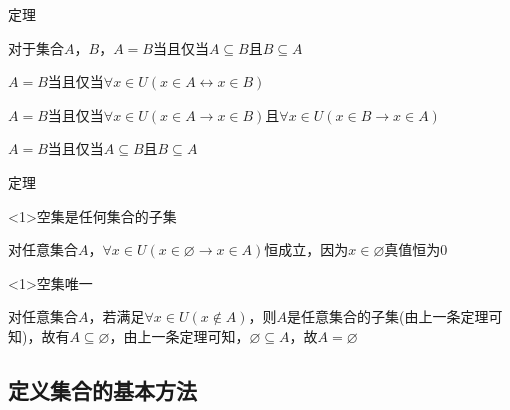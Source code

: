 \documentclass[xetex,10pt,aspectratio=43]{beamer}
\begin{document}
	\begin{frame}{定理}
		
		\begin{block}{对于集合$A$，$B$，$A=B\text{当且仅当}A\subseteq B\text{且}B\subseteq A$}
			
			$A=B\text{当且仅当}\forall x\in U(x\in A\leftrightarrow x\in B)$
			
			$A=B\text{当且仅当}\forall x\in U(x\in A\rightarrow x\in B)\text{且}\forall x\in U(x\in B\rightarrow x\in A)$
			
			$A=B\text{当且仅当}A\subseteq B\text{且}B\subseteq A$
			
		\end{block}
	
	\end{frame}

	\begin{frame}{定理}
		
		\begin{block}<1>{空集是任何集合的子集}
			
			对任意集合$A$，$\forall x\in U(x\in\varnothing\rightarrow x\in A)$恒成立，因为$x\in \varnothing$真值恒为$0$
			
		\end{block}
	
		\begin{block}<1>{空集唯一}
			
			对任意集合$A$，若满足$\forall x\in U(x\notin A)$，则$A$是任意集合的子集(由上一条定理可知)，故有$A\subseteq\varnothing$，由上一条定理可知，$\varnothing\subseteq A$，故$A=\varnothing$
			
		\end{block}
		
	\end{frame}

	\subsection{定义集合的基本方法}
	
\end{document}
